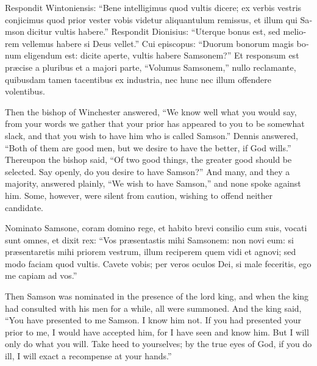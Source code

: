 \documentclass{book}
\begin{document}
\begin{paracol}{2}
\switchcolumn*

\begin{otherlanguage}{latin}
Respondit Wintoniensis: ``Bene intelligimus quod vultis dicere; ex verbis vestris conjicimus quod prior vester vobis videtur aliquantulum remissus, et illum qui Samson dicitur vultis habere.'' Respondit Dionisius: ``Uterque bonus est, sed meliorem vellemus habere si Deus vellet.'' Cui episcopus: ``Duorum bonorum magis bonum eligendum est: dicite aperte, vultis habere Samsonem?'' Et responsum est pr\ae{}cise a pluribus et a majori parte, ``Volumus Samsonem,'' nullo reclamante, quibusdam tamen tacentibus ex industria, nec hunc nec illum offendere volentibus.
\end{otherlanguage}

\switchcolumn

Then the bishop of Winchester answered, ``We know well what you would say, from your words we gather that your prior has appeared to you to be somewhat slack, and that you wish to have him who is called Samson.'' Dennis answered, ``Both of them are good men, but we desire to have the better, if God wills.'' Thereupon the bishop said, ``Of two good things, the greater good should be selected. Say openly, do you desire to have Samson?'' And many, and they a majority, answered plainly, ``We wish to have Samson,'' and none spoke against him. Some, however, were silent from caution, wishing to offend neither candidate.

\switchcolumn*

\begin{otherlanguage}{latin}
Nominato Samsone, coram domino rege, et habito brevi consilio cum suis, vocati sunt omnes, et dixit rex: ``Vos pr\ae{}sentastis mihi Samsonem: non novi eum: si pr\ae{}sentaretis mihi priorem vestrum, illum reciperem quem vidi et agnovi; sed modo faciam quod vultis. Cavete vobis; per veros oculos Dei, si male feceritis, ego me capiam ad vos.''
\end{otherlanguage}

\switchcolumn

Then Samson was nominated in the presence of the lord king, and when the king had consulted with his men for a while, all were summoned. And the king said, ``You have presented to me Samson. I know him not. If you had presented your prior to me, I would have accepted him, for I have seen and know him. But I will only do what you will. Take heed to yourselves; by the true eyes of God, if you do ill, I will exact a recompense at your hands.''


\end{paracol}
\end{document}
